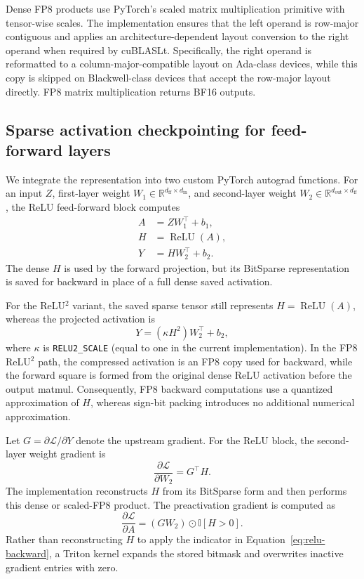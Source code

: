 Dense FP8 products use PyTorch's scaled matrix multiplication primitive with
tensor-wise scales.  The implementation ensures that the left operand is
row-major contiguous and applies an architecture-dependent layout conversion
to the right operand when required by cuBLASLt.  Specifically, the right
operand is reformatted to a column-major-compatible layout on Ada-class
devices, while this copy is skipped on Blackwell-class devices that accept
the row-major layout directly.  FP8 matrix multiplication returns BF16
outputs.

\subsection{Sparse activation checkpointing for feed-forward layers}
\label{sec:method-ffn}

We integrate the representation into two custom PyTorch autograd functions.
For an input $Z$, first-layer weight
$W_1 \in \mathbb{R}^{d_{\mathrm{ff}}\times d_{\mathrm{in}}}$, and
second-layer weight
$W_2 \in \mathbb{R}^{d_{\mathrm{out}}\times d_{\mathrm{ff}}}$, the
ReLU feed-forward block computes
\begin{align}
    A &= ZW_1^\top + b_1, \\
    H &= \operatorname{ReLU}(A), \\
    Y &= HW_2^\top + b_2.
\end{align}
The dense $H$ is used by the forward projection, but its BitSparse
representation is saved for backward in place of a full dense saved
activation.

For the ReLU$^2$ variant, the saved sparse tensor still represents
$H=\operatorname{ReLU}(A)$, whereas the projected activation is
\begin{equation}
    Y = \left(\kappa H^2\right) W_2^\top + b_2,
    \label{eq:relu2-forward}
\end{equation}
where $\kappa$ is \texttt{RELU2\_SCALE} (equal to one in the current
implementation).  In the FP8 ReLU$^2$ path, the compressed activation is an
FP8 copy used for backward, while the forward square is formed from the
original dense ReLU activation before the output matmul.  Consequently, FP8
backward computations use a quantized approximation of $H$, whereas sign-bit
packing introduces no additional numerical approximation.

Let $G=\partial \mathcal{L}/\partial Y$ denote the upstream gradient.  For
the ReLU block, the second-layer weight gradient is
\begin{equation}
    \frac{\partial \mathcal{L}}{\partial W_2}
    = G^\top H.
\end{equation}
The implementation reconstructs $H$ from its BitSparse form and then
performs this dense or scaled-FP8 product.  The preactivation gradient is
computed as
\begin{equation}
    \frac{\partial \mathcal{L}}{\partial A}
    = (GW_2) \odot \mathbb{I}[H>0].
    \label{eq:relu-backward}
\end{equation}
Rather than reconstructing $H$ to apply the indicator in
Equation~\eqref{eq:relu-backward}, a Triton kernel expands the stored
bitmask and overwrites inactive gradient entries with zero.

